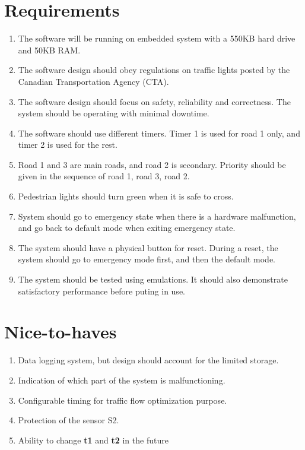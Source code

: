\documentclass[letterpaper]{article}
\begin{document}
\section{Requirements}
\begin{enumerate}
 \item The software will be running on embedded system with a 550KB hard drive and 50KB RAM.
 \item The software design should obey regulations on traffic lights posted by the Canadian Transportation Agency (CTA).
 \item The software design should focus on safety, reliability and correctness. The system should be operating with minimal downtime.
 \item The software should use different timers. Timer 1 is used for road 1 only, and timer 2 is used for the rest.
 \item Road 1 and 3 are main roads, and road 2 is secondary. Priority should be given in the sequence of road 1, road 3, road 2.
 \item Pedestrian lights should turn green when it is safe to cross.
 \item System should go to emergency state when there is a hardware malfunction, and go back to default mode when exiting emergency state.
 \item The system should have a physical button for reset. During a reset, the system should go to emergency mode first, and then the default mode.
 \item The system should be tested using emulations. It should also demonstrate satisfactory performance before puting in use.
\end{enumerate}

\section{Nice-to-haves}
\begin{enumerate}
 \item Data logging system, but design should account for the limited storage.
 \item Indication of which part of the system is malfunctioning.
 \item Configurable timing for traffic flow optimization purpose.
 \item Protection of the sensor S2.
 \item Ability to change \textbf{t1} and \textbf{t2} in the future
\end{enumerate}
\end{document}
